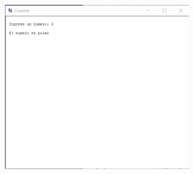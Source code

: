\documentclass{article}
\begin{document}
\begin{enumerate}
	\includegraphics[width=8cm]{img/eje3.png}
	
	\clearpage
		\end{enumerate}
	
\end{document}
